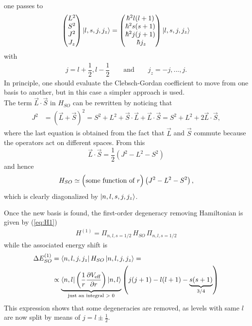 one passes to 
\begin{align*}
    \begin{pmatrix}
    L^2 \\ S^2 \\ J^2 \\ J_z 
    \end{pmatrix}
    \ket{l,s,j,j_z} = 
    \begin{pmatrix}
    \hbar^2 l(l+1) \\ \hbar^2 s(s+1) \\  \hbar^2 j(j+1) \\ \ \hbar j_z 
    \end{pmatrix}
    \ket{l,s,j,j_z}
\end{align*}
with 
\begin{align*}
    j = l +\dfrac{1}{2}, l - \dfrac{1}{2} \qquad \text{and} \qquad j_z = -j, ..., j.
\end{align*}
In principle, one should evaluate the Clebsch-Gordan coefficient to move from one basis to another, but in this case a simpler approach is used. \\
The term $\vec{L} \cdot \vec{S}$ in $H_{SO}$ can be rewritten by noticing that
\begin{align*}
{J}^2 & = (\vec{L} + \vec{S})^2 = {S}^2 + {L}^2 + \vec{S}\cdot\vec{L} + \vec{L}\cdot\vec{S} = {S}^2 + {L}^2 + 2\vec{L}\cdot\vec{S},
\end{align*}
where the last equation is obtained from the fact that $\vec{L}$ and $\vec{S}$ commute because the operators act on different spaces. From this
\begin{equation*}
\vec{L}\cdot\vec{S} = \frac{1}{2}\left( {J}^2 - {L}^2 - {S}^2\right)
\end{equation*}
and hence 
\begin{align}
    H_{SO} \simeq \Bigl( \textrm{some function of } r\Bigr) \left( {J}^2 - {L}^2 - {S}^2\right), 
\end{align}
which is clearly diagonalized by $\ket{n,l,s,j,j_z}$. 

Once the new basis is found, the first-order degeneracy removing Hamiltonian is given by (\ref{eq:H1})
\begin{align*}
    H^{(1)} = \Pi_{n,l,s=1/2}\, H_{SO}  \, \Pi_{n,l,s=1/2} 
\end{align*}
while the associated energy shift is 
\begin{align*}
\Delta E_{{SO}}^{(1)} & = \bra{n,l,j,j_z} H_{SO} \ket{n,l,j,j_z} = \\
& \propto   \underbrace{ \bra{n,l}{\left( \frac{1}{r}\frac{\partial V_{\text{eff}}}{\partial r} \right)}\ket{n,l} }_{\text{just an integral $>$ 0}}  \left( j(j+1) - l(l+1) - \underbrace{s(s+1)}_{3/4} \right)
\end{align*}
This expression shows that some degeneracies are removed, as levels with same $l$ are now split by means of $j = l \pm \frac{1}{2}$. 
\begin{center}

\end{center}

